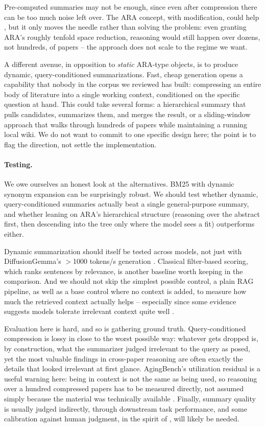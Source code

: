 Pre-computed summaries may not be enough, since even after compression there can be too much noise left over. The ARA concept, with modification, could help \cite{2604.24658}, but it only moves the needle rather than solving the problem: even granting ARA's roughly tenfold space reduction, reasoning would still happen over dozens, not hundreds, of papers -- the approach does not scale to the regime we want.

A different avenue, in opposition to \emph{static} ARA-type objects, is to produce dynamic, query-conditioned summarizations. Fast, cheap generation opens a capability that nobody in the corpus we reviewed has built: compressing an entire body of literature into a single working context, conditioned on the specific question at hand. This could take several forms: a hierarchical summary that pulls candidates, summarizes them, and merges the result, or a sliding-window approach that walks through hundreds of papers while maintaining a running local wiki. We do not want to commit to one specific design here; the point is to flag the direction, not settle the implementation.

\paragraph{Testing.}
We owe ourselves an honest look at the alternatives. BM25 with dynamic synonym expansion can be surprisingly robust. We should test whether dynamic, query-conditioned summaries actually beat a single general-purpose summary, and whether leaning on ARA's hierarchical structure (reasoning over the abstract first, then descending into the tree only where the model sees a fit) outperforms either.

Dynamic summarization should itself be tested across models, not just with DiffusionGemma's $>$1000 tokens/s generation \cite{google2026diffusiongemma}. Classical filter-based scoring, which ranks sentences by relevance, is another baseline worth keeping in the comparison. And we should not skip the simplest possible control, a plain RAG pipeline, as well as a base control where no context is added, to measure how much the retrieved context actually helps -- especially since some evidence suggests models tolerate irrelevant context quite well \cite{2202.12837}.

Evaluation here is hard, and so is gathering ground truth. Query-conditioned compression is lossy in close to the worst possible way: whatever gets dropped is, by construction, what the summarizer judged irrelevant to the query as posed, yet the most valuable findings in cross-paper reasoning are often exactly the details that looked irrelevant at first glance. AgingBench's utilization residual is a useful warning here: being in context is not the same as being used, so reasoning over a hundred compressed papers has to be measured directly, not assumed simply because the material was technically available \cite{2605.26302}. Finally, summary quality is usually judged indirectly, through downstream task performance, and some calibration against human judgment, in the spirit of \cite{2405.17044}, will likely be needed.


